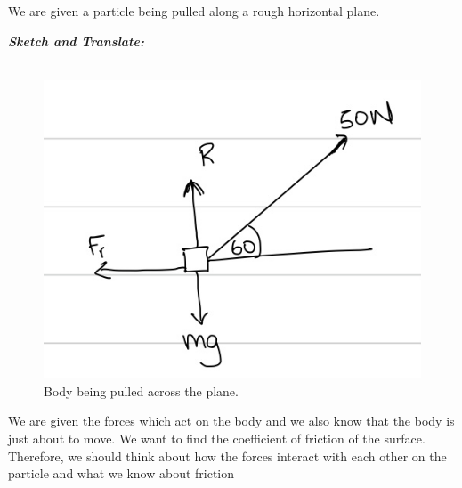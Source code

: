\begin{subquestions}
	
\subquestion
We are given a particle being pulled along a rough horizontal plane.

\textbf{\textit{Sketch and Translate:}} \\ \\
\begin{figure} [H]
	\begin{center}
		\includegraphics[scale=0.25]{../2016/figures/2016q6-2}
		\caption{\label{2016:q6:Sketch2} Body being pulled across the plane.}
	\end{center}
\end{figure}
We are given the forces which act on the body and we also know that the body is just about to move. We want to find the coefficient of friction of the surface. Therefore, we should think about how the forces interact with each other on the particle and what we know about friction





\end{subquestions}
